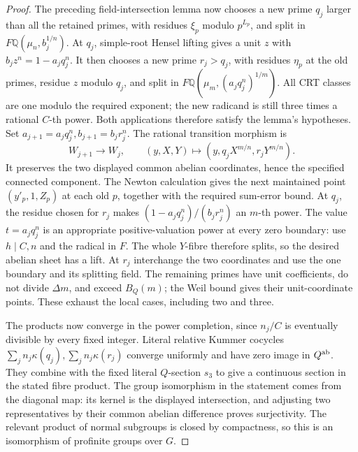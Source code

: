 \begin{proof}
The preceding field-intersection lemma now chooses a new prime \(q_j\)
larger than all the retained primes, with residues \(\xi_p\) modulo
\(p^{L_p}\), and split in
\(F\mathbb Q(\mu_n,b_j^{1/n})\).
At \(q_j\), simple-root Hensel lifting gives a unit \(z\) with
\(b_jz^n=1-a_jq_j^n\).
It then chooses a new prime \(r_j>q_j\), with residues \(\eta_p\)
at the old primes, residue \(z\) modulo \(q_j\), and split in
\(F\mathbb Q(\mu_m,(a_jq_j^n)^{1/m})\).
All CRT classes are one modulo the required exponent; the new radicand
is still three times a rational \(C\)-th power. Both applications
therefore satisfy the lemma's hypotheses.
Set \(a_{j+1}=a_jq_j^n,b_{j+1}=b_jr_j^n\).
The rational transition morphism is
\[
 W_{j+1}\longrightarrow W_j,\qquad
 (y,X,Y)\longmapsto(y,q_jX^{m/n},r_jY^{m/n}).
\]
It preserves the two displayed common abelian coordinates, hence the
specified connected component. The Newton calculation gives the next
maintained point \((y'_p,1,Z_p)\) at each old \(p\), together with
the required sum-error bound. At \(q_j\), the residue chosen for
\(r_j\) makes \((1-a_jq_j^n)/(b_jr_j^n)\) an \(m\)-th power.
The value \(t=a_jq_j^n\) is an appropriate positive-valuation power
at every zero boundary: use \(h\mid C,n\) and the radical in \(F\).
The whole \(Y\)-fibre therefore splits, so the desired abelian sheet
has a lift. At \(r_j\) interchange the two coordinates and use the
one boundary and its splitting field. The remaining primes have unit
coefficients, do not divide \(\Delta m\), and exceed \(B_Q(m)\);
the Weil bound gives their unit-coordinate points. These exhaust the
local cases, including two and three.

The products now converge in the power completion, since \(n_j/C\)
is eventually divisible by every fixed integer. Literal relative Kummer
cocycles \(\sum_jn_j\kappa(q_j),\sum_jn_j\kappa(r_j)\) converge
uniformly and have zero image in \(Q^{\rm ab}\). They combine with
the fixed literal \(Q\)-section \(s_3\) to give a continuous section
in the stated fibre product. The group isomorphism in the statement
comes from the diagonal map: its kernel is the displayed intersection,
and adjusting two representatives by their common abelian difference
proves surjectivity. The relevant product of normal subgroups is closed
by compactness, so this is an isomorphism of profinite groups over \(G\).


\end{proof}
